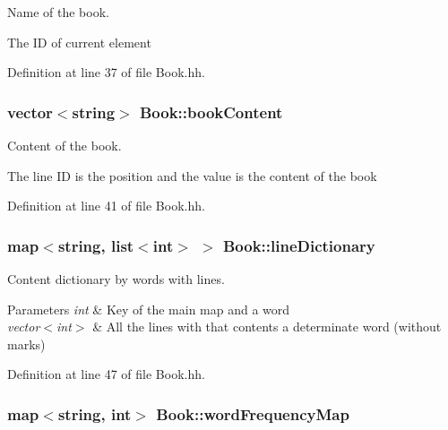 Name of the book. 

The ID of current element 

Definition at line 37 of file Book.\+hh.

\subsubsection[{\texorpdfstring{book\+Content}{bookContent}}]{\setlength{\rightskip}{0pt plus 5cm}vector$<$string$>$ Book\+::book\+Content\hspace{0.3cm}{\ttfamily [private]}}\hypertarget{class_book_a62ca3f4431b699fa41384c8bab7ef4fa}{}\label{class_book_a62ca3f4431b699fa41384c8bab7ef4fa}


Content of the book. 

The line ID is the position and the value is the content of the book 

Definition at line 41 of file Book.\+hh.

\subsubsection[{\texorpdfstring{line\+Dictionary}{lineDictionary}}]{\setlength{\rightskip}{0pt plus 5cm}map$<$string, list$<$int$>$ $>$ Book\+::line\+Dictionary\hspace{0.3cm}{\ttfamily [private]}}\hypertarget{class_book_a7da5c2f5239458c2ab88576cac8d0a10}{}\label{class_book_a7da5c2f5239458c2ab88576cac8d0a10}


Content dictionary by words with lines. 


\begin{DoxyParams}{Parameters}
{\em int} & Key of the main map and a word \\
\hline
{\em vector$<$int$>$} & All the lines with that contents a determinate word (without marks) \\
\hline
\end{DoxyParams}


Definition at line 47 of file Book.\+hh.

\subsubsection[{\texorpdfstring{word\+Frequency\+Map}{wordFrequencyMap}}]{\setlength{\rightskip}{0pt plus 5cm}map$<$string, int$>$ Book\+::word\+Frequency\+Map\hspace{0.3cm}{\ttfamily [private]}}\hypertarget{class_book_a18b73c8d2b492cad5b7b0c187b08dfc0}{}\label{class_book_a18b73c8d2b492cad5b7b0c187b08dfc0}


